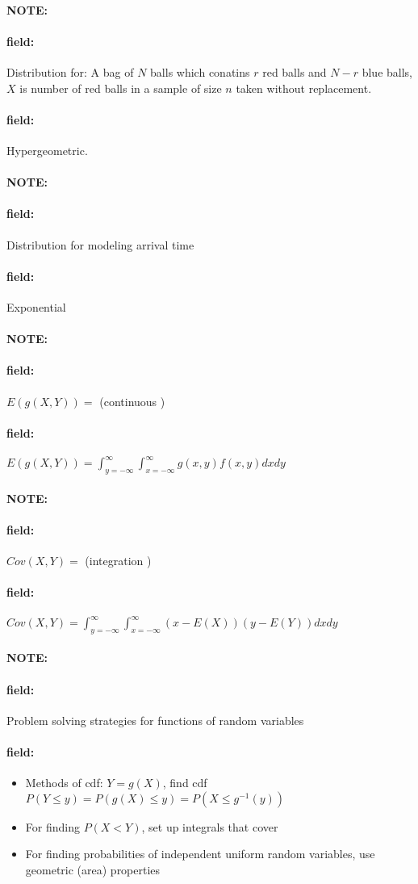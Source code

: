 \documentclass[12pt]{article}
\newenvironment{note}{\paragraph{NOTE:}}{}
\newenvironment{field}{\paragraph{field:}}{}
\begin{document}
\begin{note}
  \begin{field}
    Distribution for: A bag of $N$ balls which conatins $r$ red balls and $N-r$ blue balls, $X$ is number of red balls in a sample of size $n$ taken without replacement.
  \end{field}
  \begin{field}
    Hypergeometric.
  \end{field}
\end{note}

\begin{note}
  \begin{field}
    Distribution for modeling arrival time
  \end{field}
  \begin{field}
    Exponential
  \end{field}
\end{note}


\begin{note}
  \begin{field}
    $E(g(X,Y)) = $ (continuous )
  \end{field}
  \begin{field}
    $E(g(X,Y)) = \int_{y = - \infty}^\infty \int_{x = -\infty}^\infty g(x,y)f(x,y)dx dy$
  \end{field}
\end{note}

\begin{note}
  \begin{field}
    $Cov(X,Y) = $ (integration )
  \end{field}
  \begin{field}
    $Cov(X,Y) = \int_{y = - \infty}^\infty \int_{x = -\infty}^\infty (x - E(X))(y - E(Y))dx dy$
  \end{field}
\end{note}

\begin{note}
  \begin{field}
    Problem solving strategies for functions of random variables
  \end{field}
  \begin{field}
    \begin{itemize}
      \item Methods of cdf: $Y = g(X)$, find cdf $P(Y \leq y) = P(g(X) \leq y) = P(X \leq g^{-1}(y))$
      \item For finding $P(X < Y)$, set up integrals that cover
      \item For finding probabilities of independent uniform random variables, use geometric (area) properties
    \end{itemize}
  \end{field}
\end{note}
\end{document}
